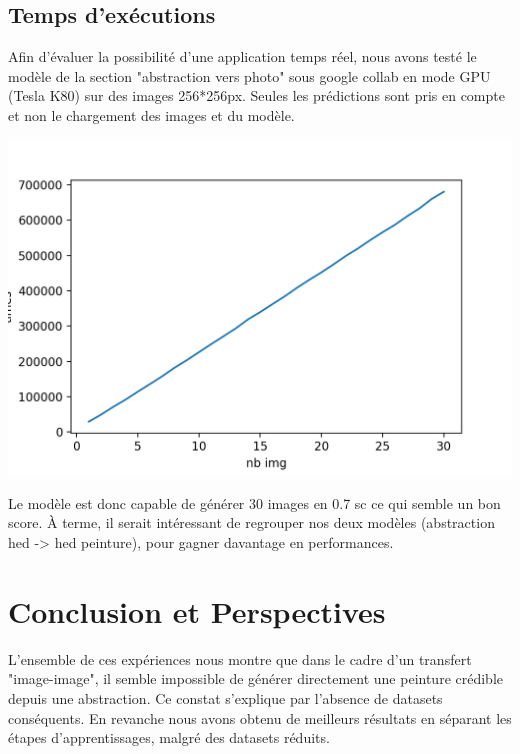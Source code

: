 \documentclass[a4paper, 12pt]{report}
\begin{document}
\pagebreak


\section{Temps d'exécutions}

Afin d'évaluer la possibilité d'une application temps réel, nous avons testé le modèle de la section "abstraction vers photo" sous google collab en mode GPU (Tesla K80) sur des images 256*256px. Seules les prédictions sont pris en compte et non le chargement des images et du modèle.

\begin{center}
  \centering
    \includegraphics[width=0.9\linewidth]{images/time-gpu.png}
\end{center}

Le modèle est donc capable de générer 30 images en 0.7 sc ce qui semble un bon score. À terme, il serait intéressant de regrouper nos deux modèles (abstraction hed -> hed peinture), pour gagner davantage en performances.


\chapter{Conclusion et Perspectives\label{chap-conclusion}}

L'ensemble de ces expériences nous montre que dans le cadre d'un transfert "image-image", il semble impossible de générer directement une peinture crédible depuis une abstraction. Ce constat s'explique par l’absence de datasets conséquents. En revanche nous avons obtenu de meilleurs résultats en séparant les étapes d'apprentissages, malgré des datasets réduits. 
\end{document}
